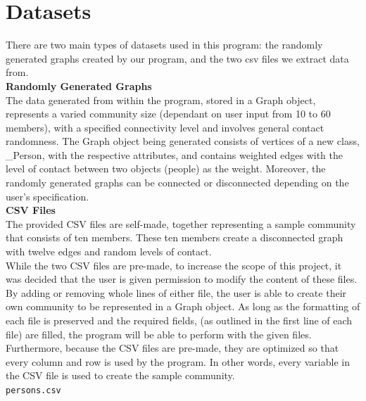 \documentclass[fontsize=11pt]{article}
\newcommand{\ttt}[1]{\texttt{#1}}
\begin{document}
    \section*{Datasets}
    There are two main types of datasets used in this program: the randomly generated graphs created by our program, and the two csv files we extract data from.\\
    \newline
    \textbf{Randomly Generated Graphs}\\
    \newline
    The data generated from within the program, stored in a Graph object, represents a varied community size (dependant on user input from 10 to 60 members), with a specified connectivity level and involves general contact randomness. The Graph object being generated consists of vertices of a new class, \_Person, with the respective attributes, and contains weighted edges with the level of contact between two objects (people) as the weight. Moreover, the randomly generated graphs can be connected or disconnected depending on the user's specification.\\
    \newline
    \textbf{CSV Files}\\
    The provided CSV files are self-made, together representing a sample community that consists of ten members. These ten members create a disconnected graph with twelve edges and random levels of contact.\\
    \newline
    While the two CSV files are pre-made, to increase the scope of this project, it was decided that the user is given permission to modify the content of these files. By adding or removing whole lines of either file, the user is able to create their own community to be represented in a Graph object. As long as the formatting of each file is preserved and the required fields, (as outlined in the first line of each file) are filled, the program will be able to perform with the given files. Furthermore, because the CSV files are pre-made, they are optimized so that every column and row is used by the program. In other words, every variable in the CSV file is used to create the sample community.\\
    \newline
    \ttt{persons.csv} \\
\end{document}
